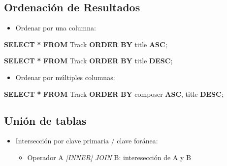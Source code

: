 \documentclass[
]{book}
\newenvironment{Shaded}{\begin{snugshade}}{\end{snugshade}}
\newcommand{\KeywordTok}[1]{\textcolor[rgb]{0.13,0.29,0.53}{\textbf{#1}}}
\newcommand{\NormalTok}[1]{#1}
\newcommand{\OperatorTok}[1]{\textcolor[rgb]{0.81,0.36,0.00}{\textbf{#1}}}
\providecommand{\tightlist}{%
  \setlength{\itemsep}{0pt}\setlength{\parskip}{0pt}}
\theoremstyle{break}
\theoremstyle{nonumberplain}
\begin{document}
\subsection{Ordenación de Resultados}\label{ordenaciuxf3n-de-resultados}

\begin{itemize}
\tightlist
\item
  Ordenar por una columna:
\end{itemize}

\begin{Shaded}
\begin{Highlighting}[]
  \KeywordTok{SELECT} \OperatorTok{*} \KeywordTok{FROM}\NormalTok{ Track}
  \KeywordTok{ORDER} \KeywordTok{BY}\NormalTok{ title }\KeywordTok{ASC}\NormalTok{; }

  \KeywordTok{SELECT} \OperatorTok{*} \KeywordTok{FROM}\NormalTok{ Track}
  \KeywordTok{ORDER} \KeywordTok{BY}\NormalTok{ title }\KeywordTok{DESC}\NormalTok{; }
\end{Highlighting}
\end{Shaded}

\begin{itemize}
\tightlist
\item
  Ordenar por múltiples columnas:
\end{itemize}

\begin{Shaded}
\begin{Highlighting}[]
  \KeywordTok{SELECT} \OperatorTok{*} \KeywordTok{FROM}\NormalTok{ Track}
  \KeywordTok{ORDER} \KeywordTok{BY}\NormalTok{ composer }\KeywordTok{ASC}\NormalTok{, title }\KeywordTok{DESC}\NormalTok{; }
\end{Highlighting}
\end{Shaded}

\subsection{Unión de tablas}\label{uniuxf3n-de-tablas}

\begin{itemize}
\item
  Intersección por clave primaria / clave foránea:

  \begin{itemize}
  \tightlist
  \item
    Operador A \emph{{[}INNER{]} JOIN} B: interesección de A y B
  \end{itemize}
\end{itemize}
\end{document}
